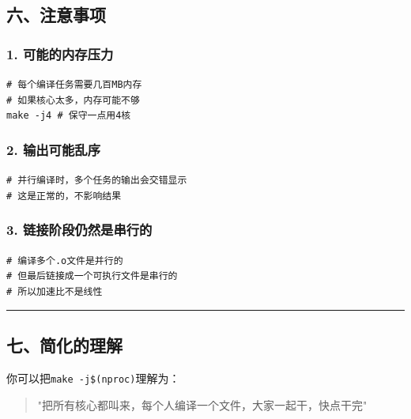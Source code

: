 \documentclass[11pt, a4paper]{article}
\begin{document}
\begin{aibox}
\subsection*{六、注意事项}

\subsubsection*{1. 可能的内存压力}
\begin{tcolorbox}[colback=white,colframe=gray!50!white,boxrule=0.5pt,arc=2pt,left=5pt,right=5pt,top=5pt,bottom=5pt]
\texttt{\# 每个编译任务需要几百MB内存}\\
\texttt{\# 如果核心太多，内存可能不够}\\
\texttt{make -j4  \# 保守一点用4核}
\end{tcolorbox}

\subsubsection*{2. 输出可能乱序}
\begin{tcolorbox}[colback=white,colframe=gray!50!white,boxrule=0.5pt,arc=2pt,left=5pt,right=5pt,top=5pt,bottom=5pt]
\texttt{\# 并行编译时，多个任务的输出会交错显示}\\
\texttt{\# 这是正常的，不影响结果}
\end{tcolorbox}

\subsubsection*{3. 链接阶段仍然是串行的}
\begin{tcolorbox}[colback=white,colframe=gray!50!white,boxrule=0.5pt,arc=2pt,left=5pt,right=5pt,top=5pt,bottom=5pt]
\texttt{\# 编译多个.o文件是并行的}\\
\texttt{\# 但最后链接成一个可执行文件是串行的}\\
\texttt{\# 所以加速比不是线性}
\end{tcolorbox}

\begin{center}\rule{\textwidth}{0.4pt}\end{center}

\subsection*{七、简化的理解}

你可以把\texttt{make -j\$(nproc)}理解为：

\begin{quote}
"把所有核心都叫来，每个人编译一个文件，大家一起干，快点干完"
\end{quote}


\end{aibox}
\end{document}
